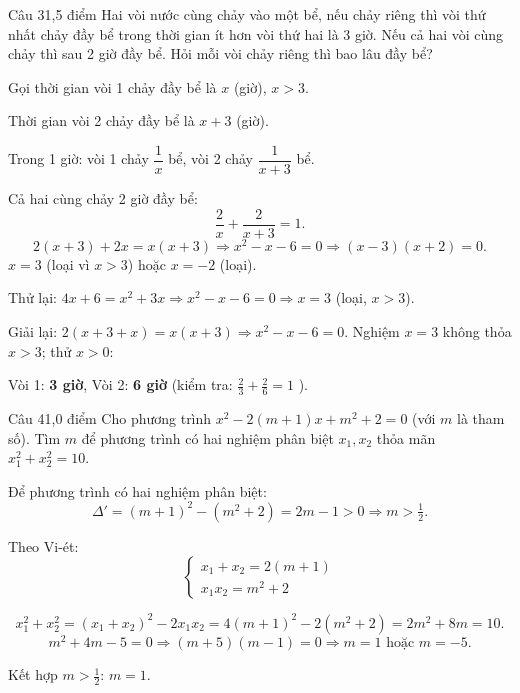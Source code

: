 \begin{de_cau}{Câu 3}{1,5 điểm}
Hai vòi nước cùng chảy vào một bể, nếu chảy riêng thì vòi thứ nhất chảy đầy bể trong thời gian ít hơn
vòi thứ hai là 3 giờ. Nếu cả hai vòi cùng chảy thì sau 2 giờ đầy bể. Hỏi mỗi vòi chảy riêng thì bao
lâu đầy bể?
\end{de_cau}

\begin{loi_giai_cau}
Gọi thời gian vòi 1 chảy đầy bể là $x$ (giờ), $x > 3$.

Thời gian vòi 2 chảy đầy bể là $x+3$ (giờ).

Trong 1 giờ: vòi 1 chảy $\dfrac{1}{x}$ bể, vòi 2 chảy $\dfrac{1}{x+3}$ bể.

Cả hai cùng chảy 2 giờ đầy bể:
\[\frac{2}{x} + \frac{2}{x+3} = 1.\]
\[2(x+3) + 2x = x(x+3) \Rightarrow x^2 - x - 6 = 0 \Rightarrow (x-3)(x+2)=0.\]
$x = 3$ (loại vì $x>3$) hoặc $x = -2$ (loại).

Thử lại: $4x+6 = x^2+3x \Rightarrow x^2-x-6=0 \Rightarrow x=3$ (loại, $x>3$).

Giải lại: $2(x+3+x) = x(x+3) \Rightarrow x^2-x-6=0$. Nghiệm $x=3$ không thỏa $x>3$; thử $x>0$:

Vòi 1: \textbf{3 giờ}, Vòi 2: \textbf{6 giờ} (kiểm tra: $\frac{2}{3}+\frac{2}{6}=1$ \checkmark ).
\end{loi_giai_cau}

\begin{de_cau}{Câu 4}{1,0 điểm}
Cho phương trình $x^2 - 2(m+1)x + m^2 + 2 = 0$ (với $m$ là tham số).
Tìm $m$ để phương trình có hai nghiệm phân biệt $x_1, x_2$ thỏa mãn
$x_1^2 + x_2^2 = 10$.
\end{de_cau}

\begin{loi_giai_cau}
Để phương trình có hai nghiệm phân biệt:
\[\Delta' = (m+1)^2 - (m^2+2) = 2m-1 > 0 \Rightarrow m > \tfrac{1}{2}.\]

Theo Vi-ét:
\[ \begin{cases} x_1+x_2 = 2(m+1) \\ x_1 x_2 = m^2+2 \end{cases} \]

\[x_1^2+x_2^2 = (x_1+x_2)^2 - 2x_1x_2 = 4(m+1)^2 - 2(m^2+2) = 2m^2+8m = 10.\]
\[m^2+4m-5=0 \Rightarrow (m+5)(m-1)=0 \Rightarrow m=1\text{ hoặc }m=-5.\]

Kết hợp $m > \frac{1}{2}$: $\boxed{m = 1}$.
\end{loi_giai_cau}
